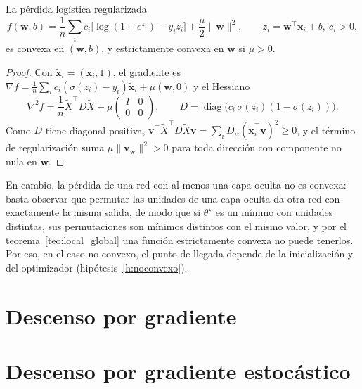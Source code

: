 \begin{proposicion}\label{prop:logistica_convexa}
La pérdida logística regularizada
\[
f(\bm w,b) = \frac1n\sum_i c_i\big[\log(1+e^{z_i}) - y_i z_i\big] + \frac\mu2\|\bm w\|^2,\qquad z_i = \bm w^\top\bm x_i + b,\ c_i>0,
\]
es convexa en $(\bm w, b)$, y estrictamente convexa en $\bm w$ si $\mu > 0$.
\end{proposicion}
\begin{proof}
Con $\tilde{\bm x}_i = (\bm x_i, 1)$, el gradiente es $\nabla f = \frac1n\sum_i c_i(\sigma(z_i) - y_i)\tilde{\bm x}_i + \mu(\bm w,0)$ y el Hessiano
\[
\nabla^2 f = \frac1n \tilde X^\top D\tilde X + \mu\begin{pmatrix} I & 0\\ 0 & 0\end{pmatrix},\qquad D = \operatorname{diag}\big(c_i\,\sigma(z_i)(1-\sigma(z_i))\big).
\]
Como $D$ tiene diagonal positiva, $\bm v^\top\tilde X^\top D\tilde X\bm v = \sum_i D_{ii}(\tilde{\bm x}_i^\top\bm v)^2\ge 0$, y el término de regularización suma $\mu\|\bm v_{\bm w}\|^2 > 0$ para toda dirección con componente no nula en $\bm w$.
\end{proof}

En cambio, la pérdida de una red con al menos una capa oculta no es convexa: basta observar que permutar las unidades de una capa oculta da otra red con exactamente la misma salida, de modo que si $\theta^\star$ es un mínimo con unidades distintas, sus permutaciones son mínimos distintos con el mismo valor, y por el teorema~\ref{teo:local_global} una función estrictamente convexa no puede tenerlos. Por eso, en el caso no convexo, el punto de llegada depende de la inicialización y del optimizador (hipótesis~\ref{h:noconvexo}).

\section{Descenso por gradiente}


\section{Descenso por gradiente estocástico}



